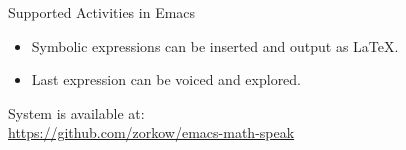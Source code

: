 \documentclass[final,hyperref={pdfpagelabels=false}]{beamer}
\begin{document}
\begin{frame}{}
\begin{columns}[t]
\begin{column}{.32\linewidth}
\begin{block}{\Large Supported Activities in Emacs}
\begin{itemize}
          \begin{itemize}
          \item Symbolic expressions can be inserted and output as {\LaTeX}.
          \item Last expression can be voiced and explored.
          \end{itemize}
        \end{itemize}
        System is available at:\\
        \textcolor{red}{\url{https://github.com/zorkow/emacs-math-speak}}
      \end{block}
    \end{column}
  \end{columns}
\end{frame}
\end{document}

